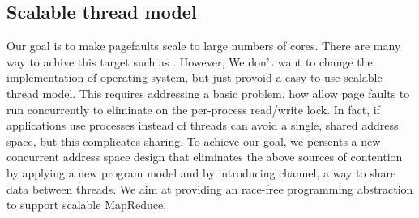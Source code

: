




\subsection{Scalable thread model}

Our goal is to make pagefaults scale to 
large numbers of cores.
There are many way to achive this target such as \cite{Clements2012Scalable}.
However, We don't want to change the implementation of operating system, 
but just provoid a easy-to-use scalable thread model.
This requires addressing a basic problem,
how allow page faults to run concurrently 
to eliminate on the per-process read/write lock.
In fact, if applications use processes instead of threads can avoid a single, 
shared address space, but this complicates sharing.
To achieve our goal, we persents a new concurrent address space design 
that eliminates the above sources of contention by applying a new program model and by introducing channel, a way to share data between threads.
We aim at providing an race-free programming abstraction 
to support scalable MapReduce.


